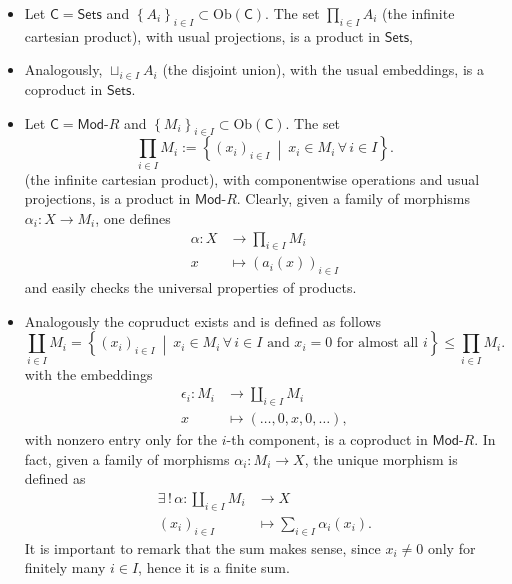 \begin{ex}\leavevmode\vspace{-.2\baselineskip}
	\begin{itemize}
		\item Let $\mathsf{C} = \mathsf{Sets}$ and $\left\{ A_i \right\}_{i \in I} \subset \mathrm{Ob} \left(\mathsf{C}\right)$.
			The set $\prod_{i \in I} A_i$ (the infinite cartesian product), with usual projections, is a product in $\mathsf{Sets}$,
		\item Analogously, $\sqcup_{i \in I} A_i$ (the disjoint union), with the usual embeddings, is a coproduct in $\mathsf{Sets}$.
		\item Let $\mathsf{C} = \mathsf{Mod}\text{-}R$ and $\left\{ M_i \right\}_{i \in I} \subset \mathrm{Ob} \left(\mathsf{C}\right)$.
			The set 
			\begin{equation}
			\prod_{i \in I} M_i := \left\{ \left( x_i \right)_{i \in I} \ \middle|\ x_i \in M_i \,\forall\, i \in I \right\}	
			.\end{equation}
			(the infinite cartesian product), with componentwise operations and usual projections, is a product in $\mathsf{Mod}\text{-}R$.
			Clearly, given a family of morphisms $\alpha_i: X \to M_i$, one defines
			\begin{align}
				\alpha: X &\to \prod_{i \in I} M_i \\
				x &\mapsto \left( a_i(x) \right)_{i \in I}
			\end{align} 
			and easily checks the universal properties of products.
		\item Analogously the copruduct exists and is defined as follows
			\begin{equation}
				\coprod_{i \in I} M_i = \left\{ \left( x_i \right)_{i \in I} \ \middle|\ x_i \in M_i \,\forall\, i \in I \text{ and } x_i = 0  \text{ for almost all } i  \right\} \leq \prod_{i \in I} M_i
			.\end{equation} 
			with the embeddings
			\begin{align}
				\epsilon_i: M_i &\to \coprod_{i \in I} M_i \\
				x &\mapsto \left( \ldots, 0, x, 0, \ldots \right)
			,\end{align} 
			with nonzero entry only for the $i$-th component, is a coproduct in $\mathsf{Mod}\text{-}R$.
			In fact, given a family of morphisms $\alpha_i: M_i \to X$, the unique morphism is defined as
			\begin{align}
				\exists\, !\, \alpha: \coprod_{i \in I}M_i &\to X \\
				\left( x_i \right)_{i\in I} &\mapsto \sum_{i \in I}^{} \alpha_i(x_i)
			.\end{align} 
			It is important to remark that the sum makes sense, since $x_i \neq 0$ only for finitely many $i \in I$, hence it is a finite sum.
	\end{itemize}
\end{ex} 


